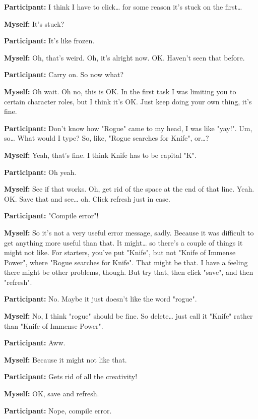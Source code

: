 \documentclass[11pt]{report}
\begin{document}
\begin{linenumbers}
\textbf{Participant:} I think I have to click\ldots{} for some reason it's stuck on the first\ldots{}

\textbf{Myself:} It's stuck?

\textbf{Participant:} It's like frozen.

\textbf{Myself:} Oh, that's weird. Oh, it's alright now. OK. Haven't seen that before.

\textbf{Participant:} Carry on. So now what?

\textbf{Myself:} Oh wait. Oh no, this is OK. In the first task I was limiting you to certain character roles, but I think it's OK. Just keep doing your own thing, it's fine.

\textbf{Participant:} Don't know how "Rogue" came to my head, I was like "yay!". Um, so\ldots{} What would I type? So, like, "Rogue searches for Knife", or\ldots{}?

\textbf{Myself:} Yeah, that's fine. I think Knife has to be capital "K".

\textbf{Participant:} Oh yeah.

\textbf{Myself:} See if that works. Oh, get rid of the space at the end of that line. Yeah. OK. Save that and see\ldots{} oh. Click refresh just in case.

\textbf{Participant:} "Compile error"!

\textbf{Myself:} So it's not a very useful error message, sadly. Because it was difficult to get anything more useful than that. It might\ldots{} so there's a couple of things it might not like. For starters, you've put "Knife", but not "Knife of Immense Power", where "Rogue searches for Knife". That might be that. I have a feeling there might be other problems, though. But try that, then click "save", and then "refresh".

\textbf{Participant:} No. Maybe it just doesn't like the word "rogue".

\textbf{Myself:} No, I think "rogue" should be fine. So delete\ldots{} just call it "Knife" rather than "Knife of Immense Power".

\textbf{Participant:} Aww.

\textbf{Myself:} Because it might not like that.

\textbf{Participant:} Gets rid of all the creativity!

\textbf{Myself:} OK, save and refresh.

\textbf{Participant:} Nope, compile error.


\end{linenumbers}
\end{document}
